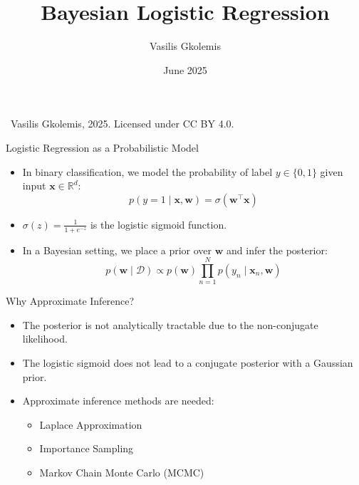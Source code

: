 \documentclass{beamer}
\title{Bayesian Logistic Regression}
\author{Vasilis Gkolemis}
\institute{ATHENA RC | HUA}
\date{June 2025}
\begin{document}


\begin{frame}
  \titlepage
  \vfill
  \footnotesize
  \textcopyright\
  Vasilis Gkolemis, 2025. Licensed under CC BY 4.0.
\end{frame}


\begin{frame}{Logistic Regression as a Probabilistic Model}
\begin{itemize}
  \item In binary classification, we model the probability of label $y \in \{0,1\}$ given input $\mathbf{x} \in \mathbb{R}^d$:
  \[
    p(y = 1 \mid \mathbf{x}, \mathbf{w}) = \sigma(\mathbf{w}^\top \mathbf{x})
  \]
  \item $\sigma(z) = \frac{1}{1 + e^{-z}}$ is the logistic sigmoid function.
  \item In a Bayesian setting, we place a prior over $\mathbf{w}$ and infer the posterior:
  \[
    p(\mathbf{w} \mid \mathcal{D}) \propto p(\mathbf{w}) \prod_{n=1}^{N} p(y_n \mid \mathbf{x}_n, \mathbf{w})
  \]
\end{itemize}
\end{frame}

\begin{frame}{Why Approximate Inference?}
\begin{itemize}
  \item The posterior is not analytically tractable due to the non-conjugate likelihood.
  \item The logistic sigmoid does not lead to a conjugate posterior with a Gaussian prior.
  \item Approximate inference methods are needed:
  \begin{itemize}
    \item Laplace Approximation
    \item Importance Sampling
    \item Markov Chain Monte Carlo (MCMC)
  \end{itemize}
\end{itemize}
\end{frame}
\end{document}
